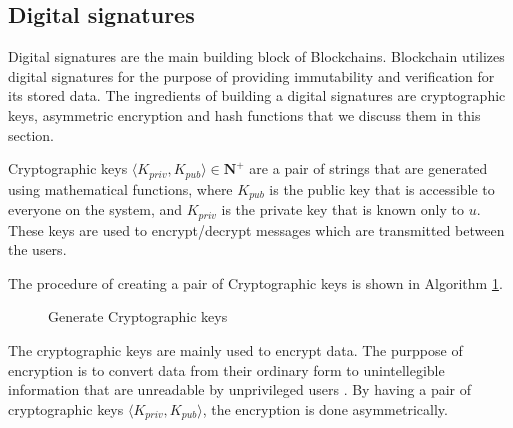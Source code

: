 		\subsection{Digital signatures} \label{sec:cryptography}
			Digital signatures are the main building block of Blockchains. Blockchain utilizes digital signatures for the purpose of providing immutability and verification for its stored data. The ingredients of building a digital signatures are cryptographic keys, asymmetric encryption and hash functions that we discuss them in this section.
			\begin{defn}
				Cryptographic keys $\langle K_{priv}, K_{pub} \rangle \in \mathbf{N}^+$ are a pair of strings  that are generated using mathematical functions, where $K_{pub}$ is the public key that is accessible to everyone on the system, and $K_{priv}$ is the private key that is known only to $u$. These keys are used to encrypt/decrypt messages which are transmitted between the users\cite{stallings2017cryptography}.
			\label{dfn:cryptographic_keys}
			\end{defn}
			The procedure of creating a pair of Cryptographic keys is shown in Algorithm \ref{alg:generate_keys}.
			\begin{figure}[h]
				\begin{algorithm}[H]
					\SetAlgoLined
					\caption{Generate Cryptographic keys}
					\SetAlCapNameFnt{\tiny}
					\SetAlgoLined
					\label{alg:generate_keys}
					\DontPrintSemicolon
				\end{algorithm}
			\end{figure}
		
		The cryptographic keys are mainly used to encrypt data. The purppose of encryption is to convert data from their ordinary form to unintellegible information that are unreadable by unprivileged users \cite{kapoor2011cryptography}. By having a pair of cryptographic keys $\langle K_{priv}, K_{pub} \rangle$, the encryption is done asymmetrically. 

